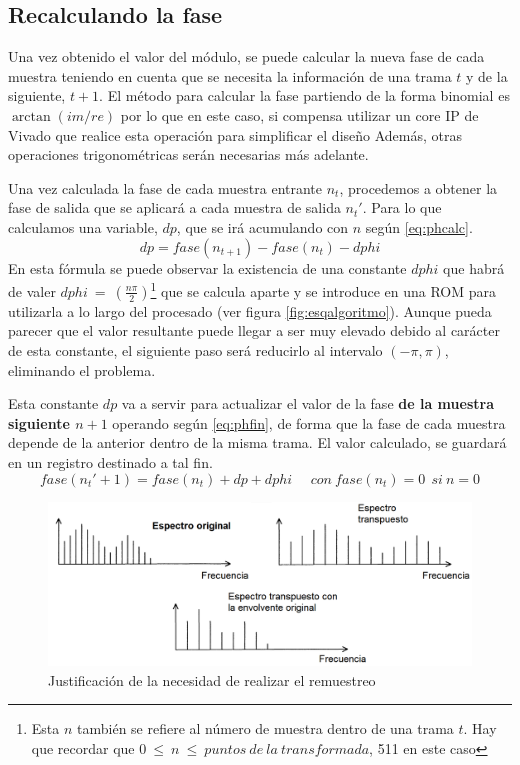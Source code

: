 \subsection{Recalculando la fase\label{calc_alg}}
Una vez obtenido el valor del módulo, se puede calcular la nueva fase de cada muestra teniendo en cuenta que se necesita la información de una trama $t$ y de la siguiente, $t+1$. El método para calcular la fase partiendo de la forma binomial es $\arctan(im/re)$ por lo que en este caso, si compensa utilizar un core IP de Vivado que realice esta operación para simplificar el diseño Además, otras operaciones trigonométricas serán necesarias más adelante.

Una vez calculada la fase de cada muestra entrante $n_{t}$, procedemos a obtener la fase de salida que se aplicará a cada muestra de salida $n_{t}'$. Para lo que calculamos una variable, $dp$, que se irá acumulando con $n$ según \ref{eq:phcalc}. 
\begin{equation}
\label{eq:phcalc}
dp = fase(n_{t+1}) - fase(n_{t}) - dphi
\end{equation} 
En esta fórmula se puede observar la existencia de una constante $dphi$ que habrá de valer $dphi~=~(\frac{n\pi}{2})$\footnote{Esta $n$ también se refiere al número de muestra dentro de una trama $t$. Hay que recordar que $0~\leq~n~\leq~puntos~de~la~transformada$, 511 en este caso} que se calcula aparte y se introduce en una ROM para utilizarla a lo largo del procesado (ver figura \ref{fig:esqalgoritmo}). Aunque pueda parecer que el valor resultante puede llegar a ser muy elevado debido al carácter de esta constante, el siguiente paso será reducirlo al intervalo $(-\pi,\pi)$, eliminando el problema.

Esta constante $dp$ va a servir para actualizar el valor de la fase \textbf{de la muestra siguiente $n+1$} operando según \ref{eq:phfin}, de forma que la fase de cada muestra depende de la anterior dentro de la misma trama. El valor calculado, se guardará en un registro destinado a tal fin.
\begin{equation}
\label{eq:phfin}
fase(n_{t}' + 1) = fase(n_{t}) + dp + dphi~~~~~~con~fase(n_{t}) = 0~~si~n=0
\end{equation} 

\begin{figure}[b]
\begin{center}
\includegraphics[width=14cm]{img/resample.png}
\caption{\label{fig:resample}Justificación de la necesidad de realizar el remuestreo}
\end{center}
\end{figure}

